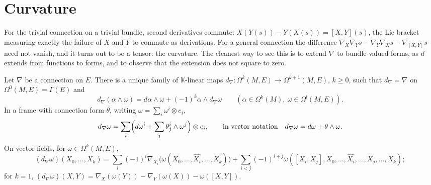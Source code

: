 \section{Curvature}\label{connections:section-curvature}

For the trivial connection on a trivial bundle, second derivatives commute: $X(Y(s)) - Y(X(s)) = [X, Y](s)$, the Lie bracket measuring exactly the failure of $X$ and $Y$ to commute
as derivations. For a general connection the difference $\nabla_X\nabla_Ys - \nabla_Y\nabla_Xs - \nabla_{[X, Y]}s$ need not vanish, and it turns out to be a tensor: the curvature.
The cleanest way to see this is to extend $\nabla$ to bundle-valued forms, as $d$ extends from functions to forms, and to observe that the extension does not square to zero.

\begin{proposition}\label{connections:proposition-exterior-covariant}
Let $\nabla$ be a connection on $E$. There is a unique family of $\mathbb{K}$-linear maps $d_\nabla \colon \Omega^k(M, E) \to \Omega^{k+1}(M, E)$, $k \geq 0$, such that
$d_\nabla = \nabla$ on $\Omega^0(M, E) = \Gamma(E)$ and
\[
d_\nabla(\alpha \wedge \omega) = d\alpha \wedge \omega + (-1)^k\alpha \wedge d_\nabla\omega \qquad (\alpha \in \Omega^k(M),\ \omega \in \Omega^l(M, E)).
\]
In a frame with connection form $\theta$, writing $\omega = \sum_i\omega^i \otimes e_i$,
\[
d_\nabla\omega = \sum_i\Bigl(d\omega^i + \sum_j\theta^i_j \wedge \omega^j\Bigr) \otimes e_i, \qquad\text{in vector notation}\quad d_\nabla\omega = d\omega + \theta \wedge \omega .
\]
On vector fields, for $\omega \in \Omega^k(M, E)$,
\[
(d_\nabla\omega)(X_0, \ldots, X_k) = \sum_i(-1)^i\nabla_{X_i}\bigl(\omega(X_0, \ldots, \widehat{X_i}, \ldots, X_k)\bigr) + \sum_{i<j}(-1)^{i+j}\omega([X_i, X_j], X_0, \ldots, \widehat{X_i}, \ldots, \widehat{X_j}, \ldots, X_k);
\]
for $k = 1$, $(d_\nabla\omega)(X, Y) = \nabla_X(\omega(Y)) - \nabla_Y(\omega(X)) - \omega([X, Y])$.
\end{proposition}

